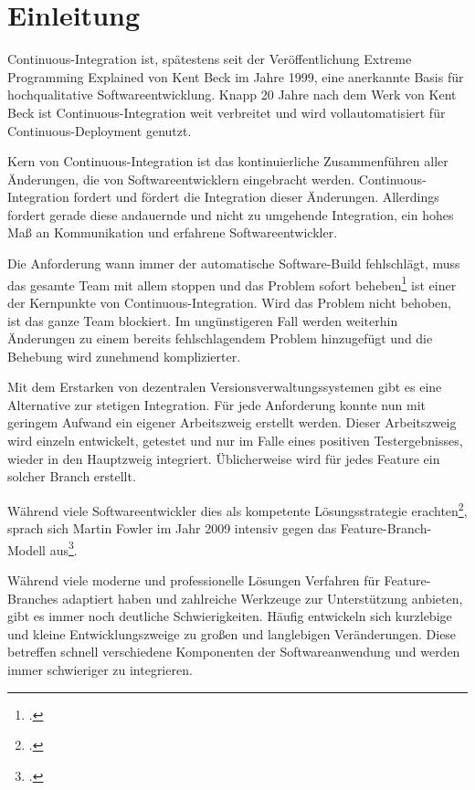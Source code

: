 \chapter{Einleitung}

Continuous-Integration ist, spätestens seit der Veröffentlichung \glqq Extreme Programming Explained\grqq{}  von Kent Beck im Jahre 1999,
eine anerkannte Basis für hochqualitative Softwareentwicklung. Knapp 20 Jahre nach dem Werk von Kent Beck ist Continuous-Integration weit
verbreitet und wird vollautomatisiert für Continuous-Deployment genutzt.

Kern von Continuous-Integration ist das kontinuierliche Zusammenführen aller Änderungen, die von Softwareentwicklern eingebracht werden. Continuous-Integration fordert und fördert die Integration dieser Änderungen.
Allerdings fordert gerade diese andauernde und nicht zu umgehende Integration, ein hohes Maß an Kommunikation und erfahrene Softwareentwickler.

Die Anforderung \glqq wann immer der automatische Software-Build fehlschlägt, muss das gesamte Team mit allem stoppen und das Problem sofort beheben\grqq{}\footcite[vgl.][]{humble2010} ist einer der Kernpunkte von Continuous-Integration. Wird das Problem nicht behoben, ist das ganze Team blockiert. Im ungünstigeren Fall werden weiterhin Änderungen zu einem bereits fehlschlagendem Problem hinzugefügt und die Behebung wird zunehmend komplizierter.

Mit dem Erstarken von dezentralen Versionsverwaltungssystemen gibt es eine Alternative zur stetigen Integration. Für jede Anforderung konnte nun mit geringem Aufwand ein eigener Arbeitszweig erstellt werden. Dieser Arbeitszweig wird einzeln entwickelt, getestet und nur im Falle eines positiven Testergebnisses, wieder in den Hauptzweig integriert. Üblicherweise wird für jedes Feature ein solcher Branch erstellt.

Während viele Softwareentwickler dies als kompetente Lösungsstrategie erachten\footcite{ci-is-dead}, sprach sich Martin Fowler im Jahr 2009 intensiv gegen das Feature-Branch-Modell aus\footcite{fowler-feature-branch}.

Während viele moderne und professionelle Lösungen Verfahren für Feature-Branches adaptiert haben und zahlreiche Werkzeuge zur Unterstützung anbieten, gibt es immer noch deutliche Schwierigkeiten. Häufig entwickeln sich \glqq kurzlebige und kleine\grqq{}
Entwicklungszweige zu \glqq großen und langlebigen\grqq{} Veränderungen. Diese betreffen schnell verschiedene Komponenten der Softwareanwendung und werden immer schwieriger zu integrieren.

